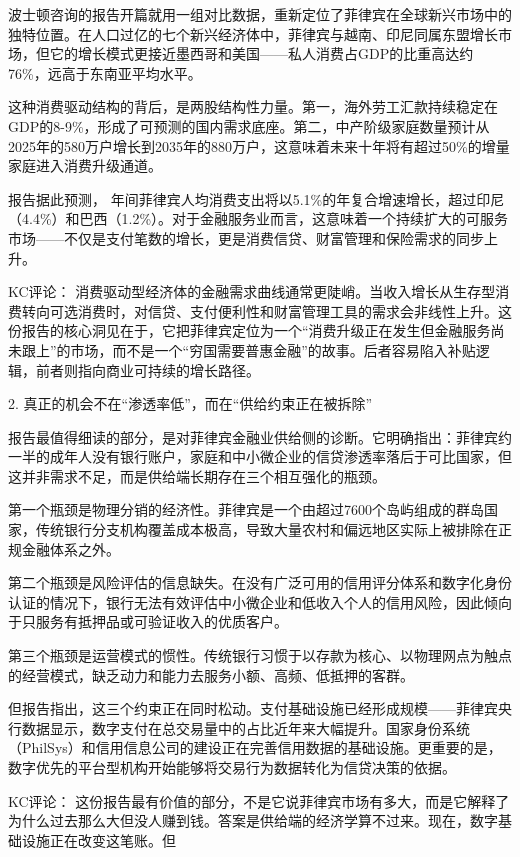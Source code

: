 \documentclass[11pt]{ctexart}
\begin{document}
波士顿咨询的报告开篇就用一组对比数据，重新定位了菲律宾在全球新兴市场中的独特位置。在人口过亿的七个新兴经济体中，菲律宾与越南、印尼同属东盟增长市场，但它的增长模式更接近墨西哥和美国——私人消费占GDP的比重高达约76\%，远高于东南亚平均水平。

这种消费驱动结构的背后，是两股结构性力量。第一，海外劳工汇款持续稳定在GDP的8-9\%，形成了可预测的国内需求底座。第二，中产阶级家庭数量预计从2025年的580万户增长到2035年的880万户，这意味着未来十年将有超过50\%的增量家庭进入消费升级通道。

报告据此预测， 年间菲律宾人均消费支出将以5.1\%的年复合增速增长，超过印尼（4.4\%）和巴西（1.2\%）。对于金融服务业而言，这意味着一个持续扩大的可服务市场——不仅是支付笔数的增长，更是消费信贷、财富管理和保险需求的同步上升。

KC评论： 消费驱动型经济体的金融需求曲线通常更陡峭。当收入增长从生存型消费转向可选消费时，对信贷、支付便利性和财富管理工具的需求会非线性上升。这份报告的核心洞见在于，它把菲律宾定位为一个“消费升级正在发生但金融服务尚未跟上”的市场，而不是一个“穷国需要普惠金融”的故事。后者容易陷入补贴逻辑，前者则指向商业可持续的增长路径。

2. 真正的机会不在“渗透率低”，而在“供给约束正在被拆除”

报告最值得细读的部分，是对菲律宾金融业供给侧的诊断。它明确指出：菲律宾约一半的成年人没有银行账户，家庭和中小微企业的信贷渗透率落后于可比国家，但这并非需求不足，而是供给端长期存在三个相互强化的瓶颈。

第一个瓶颈是物理分销的经济性。菲律宾是一个由超过7600个岛屿组成的群岛国家，传统银行分支机构覆盖成本极高，导致大量农村和偏远地区实际上被排除在正规金融体系之外。

第二个瓶颈是风险评估的信息缺失。在没有广泛可用的信用评分体系和数字化身份认证的情况下，银行无法有效评估中小微企业和低收入个人的信用风险，因此倾向于只服务有抵押品或可验证收入的优质客户。

第三个瓶颈是运营模式的惯性。传统银行习惯于以存款为核心、以物理网点为触点的经营模式，缺乏动力和能力去服务小额、高频、低抵押的客群。

但报告指出，这三个约束正在同时松动。支付基础设施已经形成规模——菲律宾央行数据显示，数字支付在总交易量中的占比近年来大幅提升。国家身份系统（PhilSys）和信用信息公司的建设正在完善信用数据的基础设施。更重要的是，数字优先的平台型机构开始能够将交易行为数据转化为信贷决策的依据。

KC评论： 这份报告最有价值的部分，不是它说菲律宾市场有多大，而是它解释了为什么过去那么大但没人赚到钱。答案是供给端的经济学算不过来。现在，数字基础设施正在改变这笔账。但
\end{document}
